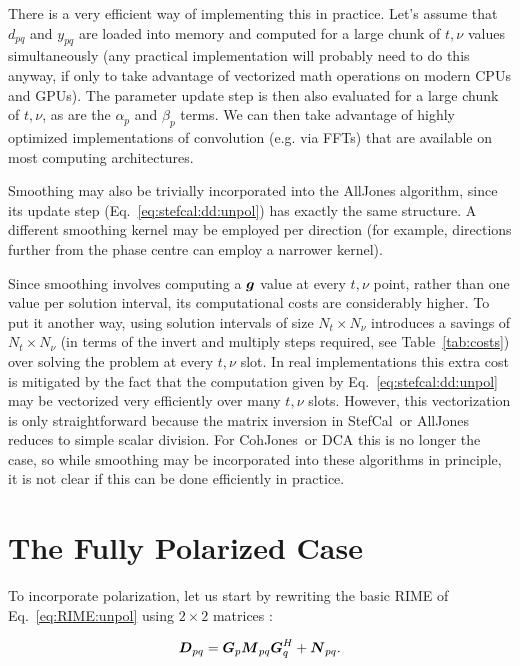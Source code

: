 \documentclass[useAMS,usenatbib]{mn2e}
\newcommand{\vecg}{\bmath{g}}
\newcommand{\mat}[1]{{\bmath{#1}}}
\newcommand{\DD}{\mat{D}}
\newcommand{\MM}{\mat{M}}
\newcommand{\GG}{\mat{G}}
\newcommand{\COH}{{\sc CohJones}}
\newcommand{\StefCal}{{\sc StefCal}}
\begin{document}
There is a very efficient way of implementing this in practice. Let's assume that $d_{pq}$ and $y_{pq}$ are loaded into memory 
and computed for a large chunk of $t,\nu$ values simultaneously (any practical implementation will probably need to do this anyway, 
if only to take advantage of vectorized math operations on modern CPUs and GPUs). The parameter update step is then also evaluated
for a large chunk of $t,\nu$, as are the $\alpha_p$ and $\beta_p$ terms. We can then take advantage of highly optimized 
implementations of convolution (e.g. via FFTs) that are available on most computing architectures. 

Smoothing may also be trivially incorporated into the {\sc AllJones} algorithm, since its update step (Eq.~\ref{eq:stefcal:dd:unpol}) 
has exactly the same structure. A different smoothing kernel may be employed per direction (for example, directions further from 
the phase centre can employ a narrower kernel). 

Since smoothing involves computing a $\vecg$ value at every $t,\nu$ point, rather than one value per
solution interval, its computational costs are considerably higher. To put it another way, using solution intervals of 
size $N_t\times N_\nu$ introduces a savings of $N_t\times N_\nu$ (in terms of the invert and multiply steps required, see 
Table~\ref{tab:costs}) over solving the problem at every $t,\nu$ slot. In real implementations this extra cost is mitigated 
by the fact that  the computation given by Eq.~\ref{eq:stefcal:dd:unpol} may be vectorized very efficiently over many $t,\nu$ slots.
However, this vectorization is only straightforward because the matrix inversion in \StefCal\ or {\sc AllJones} reduces to simple 
scalar division.  For \COH\ or DCA this is no longer the case, so while smoothing may be incorporated into these algorithms 
in principle, it is not clear if this can be done efficiently in practice.

\section{The Fully Polarized Case}
\label{sec:pol}

To incorporate polarization, let us start by rewriting the basic RIME of Eq.~\ref{eq:RIME:unpol} using $2\times 2$ matrices 
\citep[a full derivation may be found in][]{RRIME1}:

\begin{equation}
\label{eq:RIME:pol}
\DD_{pq} = \GG_p \MM_{pq} \GG^H_q + \mat{N}_{pq}.
\end{equation}
\end{document}
